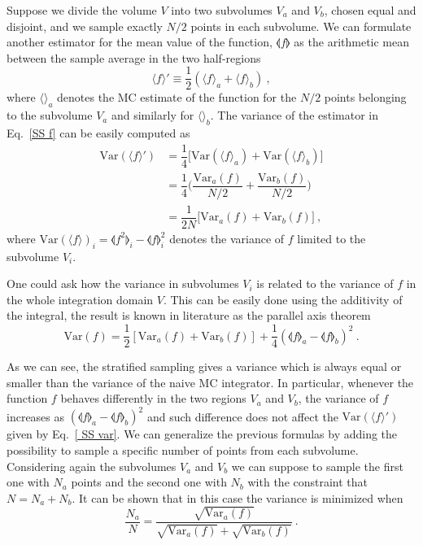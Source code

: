 \documentclass[../main/main.tex]{subfiles}
\begin{document}
Suppose we divide the volume $V$ into two subvolumes $V_a$  and $V_b$, chosen equal and disjoint, and we sample exactly $N/2$ points in each subvolume. We can formulate another estimator for the mean value of the function, $\llangle f \rrangle $ as the arithmetic mean between the sample average
in the two half-regions
\begin{equation}
	\label {SS f}
	\langle f  \rangle ' \equiv \frac{1}{2} (  \langle f \rangle_a + \langle f \rangle_b ) \ ,
\end{equation}
where $\langle \rangle_a$ denotes the MC estimate of the function for the $N/2$ points belonging to the subvolume $V_a$ and similarly for $\langle \rangle_b$.
The variance of the estimator in Eq.~\ref{SS f} can be easily computed as
\begin{eqnarray}
	\text{Var}(\langle f \rangle ') &= \dfrac{1}{4}  \big[  \text{Var}(\langle f \rangle_a) +\text{Var}(\langle f \rangle_b)  \big]  \\
	&= \dfrac{1}{4} \bigg(  \dfrac{\text{Var}_a(f)}{N/2} +\dfrac{\text{Var}_b(f)}{N/2} \bigg) \\
	&= \dfrac{1}{2N} \big[ \text{Var}_a(f) + \text{Var}_b(f)\big] \label{var_stratified} \ ,
	\label{ SS var}
\end{eqnarray}
where $\text{Var}(\langle f \rangle)_{i} = \llangle f^2 \rrangle_i - \llangle f \rrangle^2_i$ denotes the variance of $f$ limited to the subvolume $V_i$.

One could ask how the variance in subvolumes $V_i$ is related to the variance of $f$ in the whole integration domain $V$. This can be easily done using the additivity of the integral, the result is known in literature as the parallel axis theorem
\begin{equation}
	\text{Var}(f) = \frac{1}{2} [ \text{Var}_a(f) + \text{Var}_b(f)] + \frac{1}{4} ( 
	\llangle f \rrangle_a - \llangle f \rrangle_b)^2 \ .
\end{equation}

As we can see, the stratified sampling gives a variance which is always equal or smaller than the variance of the naive MC integrator. In particular, whenever the function $f$ behaves differently in 
the two regions $V_a$ and $V_b$, the variance of $f$ increases as $ ( 
\llangle f \rrangle_a - \llangle f \rrangle_b)^2$ and such difference does not affect the $\text{Var}(\langle f \rangle')$ given by Eq.~\ref{ SS var}.
\newline
We can generalize the previous formulas by adding the possibility to sample a specific number of 
points from each subvolume. Considering again the subvolumes $V_a$ and $V_b$ we can suppose 
to sample the first one with $N_a$ points and the second one with $N_b$ with the constraint that $N = N_a + N_b$. 
\newline
It can be shown that in this case the variance is minimized when \cite{Press:1989vk}
\begin{equation}
	\frac{N_a}{N} = \frac{\sqrt{\text{Var}_a(f)}}{\sqrt{\text{Var}_a(f)}+
		\sqrt{\text{Var}_b(f)}} \ .
\end{equation}
\end{document}
